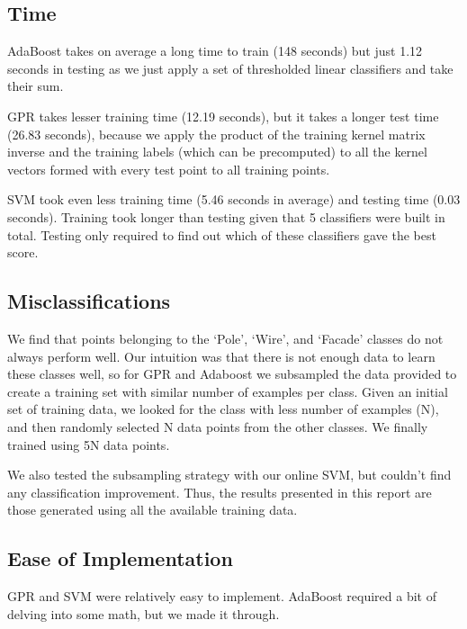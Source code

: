 \documentclass[letterpaper]{article}
\begin{document}
\subsection*{Time}
AdaBoost takes on average a long time to train (148 seconds) but just
1.12 seconds in testing as we just apply a set of thresholded linear
classifiers and take their sum. 

GPR takes lesser training time (12.19
seconds), but it takes a longer test time (26.83 seconds), because we
apply the product of the training kernel matrix inverse and the
training labels (which can be precomputed) to all the kernel vectors
formed with every test point to all training points.

SVM took even less training time (5.46 seconds in average) and testing
time (0.03 seconds). Training took longer than testing given that 5
classifiers were built in total.  Testing only required to find
out which of these classifiers gave the best score.

\subsection*{Misclassifications}
We find that points belonging to the `Pole', `Wire', and `Facade'
classes do not always perform well. Our intuition was that there is
not enough data to learn these classes well, so for GPR and Adaboost
we subsampled the data provided to create a training set with similar
number of examples per class. Given an initial set of training data,
we looked for the class with less number of examples (N), and then
randomly selected N data points from the other classes. We finally
trained using 5N data points.

We also tested the subsampling strategy with our online SVM, but
couldn't find any classification improvement. Thus, the results
presented in this report are those generated using all the available
training data.

\subsection*{Ease of Implementation}
GPR and SVM were relatively easy to implement. AdaBoost required a bit of delving into some math, but we made it through.
\end{document}
